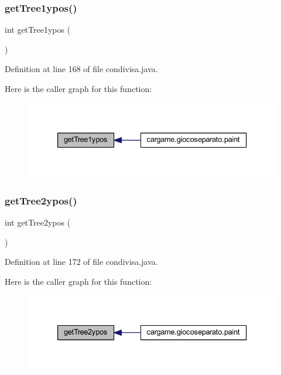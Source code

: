 \subsubsection{\texorpdfstring{get\+Tree1ypos()}{getTree1ypos()}}
{\footnotesize\ttfamily int get\+Tree1ypos (\begin{DoxyParamCaption}{ }\end{DoxyParamCaption})}



Definition at line 168 of file condivisa.\+java.

Here is the caller graph for this function\+:
\nopagebreak
\begin{figure}[H]
\begin{center}
\leavevmode
\includegraphics[width=333pt]{classcargame_1_1condivisa_a356433543b0604c02ccbd5517dac4353_icgraph}
\end{center}
\end{figure}
\mbox{\label{classcargame_1_1condivisa_a76c90994208b1d3e48135a8ab702bbac}} 
\subsubsection{\texorpdfstring{get\+Tree2ypos()}{getTree2ypos()}}
{\footnotesize\ttfamily int get\+Tree2ypos (\begin{DoxyParamCaption}{ }\end{DoxyParamCaption})}



Definition at line 172 of file condivisa.\+java.

Here is the caller graph for this function\+:
\nopagebreak
\begin{figure}[H]
\begin{center}
\leavevmode
\includegraphics[width=333pt]{classcargame_1_1condivisa_a76c90994208b1d3e48135a8ab702bbac_icgraph}
\end{center}
\end{figure}
\mbox{\label{classcargame_1_1condivisa_aca8c6ef62d607dc011069ec395602291}} 

